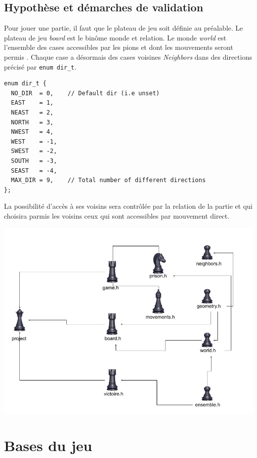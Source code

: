 \documentclass[a4paper]{article}
\begin{document}
\subsection{Hypothèse et démarches de validation}
Pour jouer une partie, il faut que le plateau de jeu soit définie au préalable. Le plateau de jeu \textit{board}  est 
le binôme monde et relation. 
Le monde \textit{world} est l’ensemble des cases accessibles par les pions et dont les mouvements seront permis . Chaque case a 
désormais des cases voisines \textit{Neighbors} dans des directions précisé par \lstinline|enum dir_t|.
\begin{lstlisting}
enum dir_t {
  NO_DIR  = 0,    // Default dir (i.e unset)
  EAST    = 1,
  NEAST   = 2,
  NORTH   = 3,
  NWEST   = 4,
  WEST    = -1,
  SWEST   = -2,
  SOUTH   = -3,
  SEAST   = -4,
  MAX_DIR = 9,    // Total number of different directions
};
\end{lstlisting}
La possibilité d’accès à ses voisins sera contrôlée par la relation de la partie et qui choisira parmis les voisins ceux qui sont
 accessibles par mouvement direct.  
 
 
 \begin{center}
\includegraphics[scale=0.5]{Dessin sans titre.jpg} 

\end{center}

\section{Bases du jeu}
\end{document}

